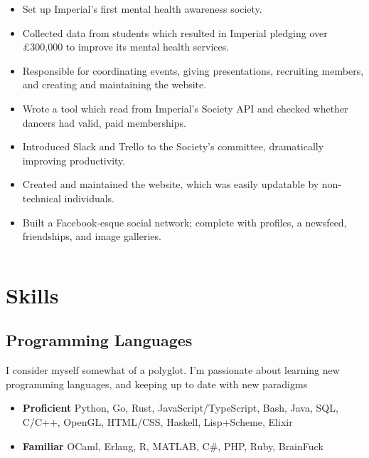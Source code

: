 \documentclass{jcgcv}
\begin{document}
\begin{column}
\begin{itemize}
  \item Set up Imperial's first mental health awareness society.
  \item Collected data from students which resulted in Imperial pledging
        over \pounds300,000 to improve its mental health services.
  \item Responsible for coordinating events, giving presentations, recruiting
        members, and creating and maintaining the website.
\end{itemize}

\begin{itemize}
  \item Wrote a tool which read from Imperial's Society API and checked
        whether dancers had valid, paid memberships.
  \item Introduced Slack and Trello to the Society's committee, dramatically 
        improving productivity.
  \item Created and maintained the website, which was easily updatable by
        non-technical individuals.
\end{itemize}

\begin{itemize}
  \item Built a Facebook-esque social network; complete with profiles, a
        newsfeed, friendships, and image galleries.
\end{itemize}

\end{column}\begin{column}

\section{Skills}

\subsection{Programming Languages}

I consider myself somewhat of a polyglot. I'm passionate about learning new
programming languages, and keeping up to date with new paradigms

\begin{itemize}
  \item \textbf{Proficient} Python, Go, Rust, JavaScript/TypeScript, Bash, Java,
        SQL, C/C++, OpenGL, HTML/CSS, Haskell, Lisp+Scheme, Elixir
  \item \textbf{Familiar} OCaml, Erlang, R, MATLAB, C\#, PHP, Ruby, BrainFuck
\end{itemize}


\end{column}
\end{document}
